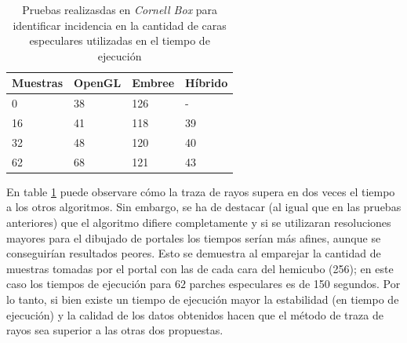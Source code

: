 \begin{table}[H]
	\centering
	\caption{Pruebas realizasdas en \textit{Cornell Box} para identificar incidencia en la cantidad de caras especulares utilizadas en el tiempo de ejecución}
\begin{tabular}{|l|l|l|l|}
	\hline
	\multicolumn{1}{|c|}{Muestras} & \multicolumn{1}{c|}{OpenGL} & \multicolumn{1}{c|}{Embree} & \multicolumn{1}{c|}{Híbrido} \\ \hline
	0                              & 38                          & 126                         & -                            \\ \hline
	16                             & 41                          & 118                         & 39                           \\ \hline
	32                             & 48                          & 120                         & 40                           \\ \hline
	62                             & 68                          & 121                         & 43                           \\ \hline
\end{tabular}
	\label{tab:caso3}
\end{table}

En table \ref{tab:caso3} puede observare cómo la traza de rayos supera en dos veces el tiempo a los otros algoritmos. Sin embargo, se ha de destacar (al igual que en las pruebas anteriores) que el algoritmo difiere completamente y si se utilizaran resoluciones mayores para el dibujado de portales los tiempos serían más afines, aunque se conseguirían resultados peores. Esto se demuestra al emparejar la cantidad de muestras tomadas por el portal con las de cada cara del hemicubo (256); en este caso los tiempos de ejecución para $62$ parches especulares es de 150 segundos. Por lo tanto, si bien existe un tiempo de ejecución mayor la estabilidad (en tiempo de ejecución) y la calidad de los datos obtenidos hacen que el método de traza de rayos sea superior a las otras dos propuestas.

